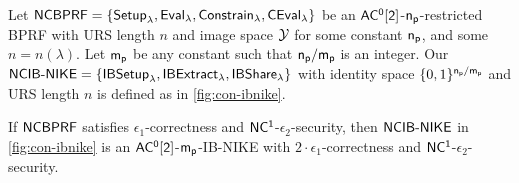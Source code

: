 Let $\mathsf{NCBPRF} = \{ \mathsf{Setup}_{\lambda},\allowbreak \mathsf{Eval}_{\lambda}, \mathsf{Constrain}_{\lambda}, \mathsf{CEval}_{\lambda} \} $ be an \allowbreak $\mathsf{AC^0[2]}$-$\mathsf{n_p}$-\allowbreak restricted BPRF with URS length $n$ and image space $\mathcal{Y}$ for some constant $\mathsf{n_p}$, and some $n = n(\lambda)$. Let $\mathsf{m_p}$ be any constant such that $\mathsf{n_p}/\mathsf{m_p}$ is an integer. Our $\mathsf{NCIB\text{-}NIKE} = \{ \mathsf{IBSetup}_{\lambda},\allowbreak \mathsf{IBExtract}_{\lambda},\allowbreak \mathsf{IBShare}_{\lambda} \}$ with identity space $\{0, 1\}^{\mathsf{n_p}/\mathsf{m_p}}$ and URS length $n$ is defined as in \cref{fig:con-ibnike}.
\begin{theorem}
\label{thm:nc-ibnike-security}
If $\mathsf{NCBPRF}$ satisfies \allowbreak $\epsilon_1$\allowbreak-correctness and $\mathsf{NC^1}$-$\epsilon_2$-security, then $\mathsf{NCIB\text{-}NIKE}$ in \cref{fig:con-ibnike} is an $\mathsf{AC^0[2]}$-$\mathsf{m_p}$-IB-NIKE with $2\cdot\epsilon_1$-correctness and $\mathsf{NC^1}$-$\epsilon_2$-security.
\end{theorem}
